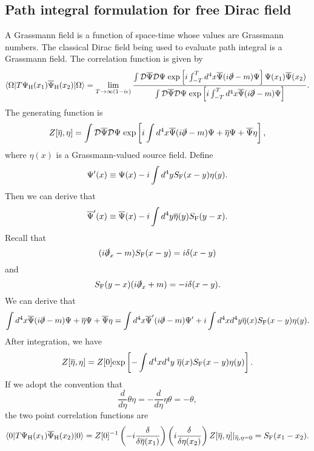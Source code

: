 \subsection{Path integral formulation for free Dirac field}
A Grassmann field is a function of space-time whose values are Grassmann numbers. The classical Dirac field being used to evaluate path integral is a Grassmann field. The correlation function is given by
\[\langle \Omega | T \Psi_{\rm H}(x_1) \overline{\Psi}_{\rm H}(x_2)| \Omega \rangle = \lim_{T \to \infty(1-i\epsilon)} \frac{\int \mathcal{D}\overline{\Psi} \mathcal{D}\Psi \; \mathrm{exp} \left[ i\int_{-T}^T d^4x \overline{\Psi}(i\slashed{\partial}-m)\Psi \right] \Psi(x_1) \overline{\Psi}(x_2)}{\int \mathcal{D}\overline{\Psi} \mathcal{D}\Psi \; \mathrm{exp} \left[ i\int_{-T}^T d^4x \overline{\Psi}(i\slashed{\partial}-m)\Psi \right]}.\]
The generating function is 
\[Z[\overline{\eta},\eta] = \int \mathcal{D}\overline{\Psi} \mathcal{D}\Psi \; \mathrm{exp} \left[ i\int d^4x \overline{\Psi}(i\slashed{\partial}-m)\Psi + \overline{\eta}\Psi + \overline{\Psi}\eta \right],\]
where $\eta(x)$ is a Grassmann-valued source field. 
Define
\[\Psi'(x) \equiv \Psi(x) - i \int d^4y S_{\rm F}(x-y)\eta(y).\]
Then we can derive that
\[\overline{\Psi}'(x) \equiv \overline{\Psi}(x) - i \int d^4y \overline{\eta}(y)S_{\rm F}(y-x).\]
Recall that
\[(i\slashed{\partial}_x-m)S_{\rm F}(x-y) = i\delta(x-y)\]
and
\[S_{\rm F}(y-x)(i \slashed{\partial}_x+m) = -i\delta(x-y).\]
We can derive that
\[\int d^4x \overline{\Psi}(i\slashed{\partial}-m)\Psi + \overline{\eta}\Psi + \overline{\Psi}\eta = \int d^4x \overline{\Psi}'(i\slashed{\partial}-m)\Psi' + i \int d^4x d^4y \overline{\eta}(x)S_{\rm F}(x-y)\eta(y) .\]
After integration, we have
\[Z[\overline{\eta},\eta] = Z[0] \mathrm{exp} \left[ -\int d^4x d^4y \; \overline{\eta}(x)S_{\rm F}(x-y)\eta(y) \right].\]
If we adopt the convention that
\[\frac{d}{d\eta} \theta \eta = - \frac{d}{d\eta} \eta \theta = - \theta,\]
the two point correlation functions are
\[\langle 0 | T \Psi_{\rm H}(x_1) \overline{\Psi}_{\rm H}(x_2)| 0 \rangle = Z[0]^{-1} \left(-i \frac{\delta}{\delta \overline{\eta}(x_1)} \right) \left(i \frac{\delta}{\delta \eta(x_2)} \right) Z[\overline{\eta},\eta]|_{\overline{\eta},\eta=0} = S_{\rm F}(x_1-x_2) .\]

